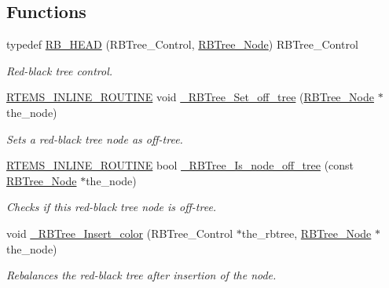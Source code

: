 \subsection*{Functions}
\begin{DoxyCompactItemize}
\item 
typedef \mbox{\hyperlink{group__RTEMSScoreRBTree_ga64d3e47d6fcda98acddb35fd53f28f26}{R\+B\+\_\+\+H\+E\+AD}} (R\+B\+Tree\+\_\+\+Control, \mbox{\hyperlink{structRBTree__Node}{R\+B\+Tree\+\_\+\+Node}}) R\+B\+Tree\+\_\+\+Control
\begin{DoxyCompactList}\small\item\em Red-\/black tree control. \end{DoxyCompactList}\item 
\mbox{\hyperlink{group__RTEMSScoreBaseDefs_gac216239df231d5dbd15e3520b0b9313f}{R\+T\+E\+M\+S\+\_\+\+I\+N\+L\+I\+N\+E\+\_\+\+R\+O\+U\+T\+I\+NE}} void \mbox{\hyperlink{group__RTEMSScoreRBTree_ga82d9b6f1aad201e7c8b614a0e970b356}{\+\_\+\+R\+B\+Tree\+\_\+\+Set\+\_\+off\+\_\+tree}} (\mbox{\hyperlink{structRBTree__Node}{R\+B\+Tree\+\_\+\+Node}} $\ast$the\+\_\+node)
\begin{DoxyCompactList}\small\item\em Sets a red-\/black tree node as off-\/tree. \end{DoxyCompactList}\item 
\mbox{\hyperlink{group__RTEMSScoreBaseDefs_gac216239df231d5dbd15e3520b0b9313f}{R\+T\+E\+M\+S\+\_\+\+I\+N\+L\+I\+N\+E\+\_\+\+R\+O\+U\+T\+I\+NE}} bool \mbox{\hyperlink{group__RTEMSScoreRBTree_ga4076722f9dbc78d8e6682b88a3ed0c8e}{\+\_\+\+R\+B\+Tree\+\_\+\+Is\+\_\+node\+\_\+off\+\_\+tree}} (const \mbox{\hyperlink{structRBTree__Node}{R\+B\+Tree\+\_\+\+Node}} $\ast$the\+\_\+node)
\begin{DoxyCompactList}\small\item\em Checks if this red-\/black tree node is off-\/tree. \end{DoxyCompactList}\item 
void \mbox{\hyperlink{group__RTEMSScoreRBTree_gaa303230648c3b9b472362387864698ed}{\+\_\+\+R\+B\+Tree\+\_\+\+Insert\+\_\+color}} (R\+B\+Tree\+\_\+\+Control $\ast$the\+\_\+rbtree, \mbox{\hyperlink{structRBTree__Node}{R\+B\+Tree\+\_\+\+Node}} $\ast$the\+\_\+node)
\begin{DoxyCompactList}\small\item\em Rebalances the red-\/black tree after insertion of the node. \end{DoxyCompactList}\item 

\end{DoxyCompactItemize}
